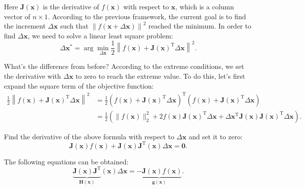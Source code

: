 Here $\bm{J}(\bm{x})$ is the derivative of $f(\bm{x})$ with respect to $\bm{x}$, which is a column vector of $n \times 1$. According to the previous framework, the current goal is to find the increment $\Delta \bm{x}$ such that $\left\| {f\left( \bm{x} + \Delta \bm{x} \right)} \right \|^2$ reached the minimum. In order to find $\Delta \bm{x}$, we need to solve a linear least square problem:
\begin{equation}
    \Delta \bm{x}^* = \arg \mathop {\min }\limits_{\Delta \bm{x}} \frac{1}{2}{\left\| {f\left( \bm{x} \right) + \bm{J} \left( \bm{x} \right)^\mathrm{T} \Delta \bm{x} } \right\|^2}.
\end{equation}
    
What's the difference from before? According to the extreme conditions, we set the derivative with $\Delta \bm{x}$ to zero to reach the extreme value. To do this, let's first expand the square term of the objective function:
\begin{align*}
    \frac{1}{2}{\left\| {f\left( \bm{x} \right) + \bm{J} \left( \bm{x} \right)^\mathrm{T} \Delta \bm{x}} \right\|^2} &= \frac{1}{2}{\left( {f\left( \bm{x} \right) + \bm{J}\left( \bm{x} \right)^\mathrm{T} \Delta \bm{x}} \right)^\mathrm{T}}\left( {f\left( \bm{x} \right) + \bm{J} \left( \bm{x} \right)^\mathrm{T} \Delta \bm{x}} \right)\\
    &= \frac{1}{2}\left( \| f{{\left( \bm{x} \right)}\|^2_2 + 2 f\left( \bm{x} \right) \bm{J} {{\left( \bm{x} \right)}}^\mathrm{T} \Delta \bm{x} + \Delta { \bm{x}^\mathrm{T}}{\bm{J} (\bm{x})} \bm{J}(\bm{x})^\mathrm{T} \Delta \bm{x}} \right).
\end{align*}


Find the derivative of the above formula with respect to $\Delta \bm{x}$ and set it to zero:
\begin{displaymath}
    \bm{J} {\left( \bm{x} \right)}f\left( \bm{x} \right) + \bm{J} {\left( \bm{x} \right)} \bm{J}^\mathrm{T} \left( \bm{x} \right)\Delta \bm{x} = \bm{0}.
\end{displaymath}

The following equations can be obtained:
\begin{equation}
    \underbrace{\bm{J} {\left( \bm{x} \right)} \bm{J}^\mathrm{T}}_{\bm{H}(\bm{x})} \left( \bm{x} \right)\Delta \bm{x} =  \underbrace{- \bm{J} {\left( \bm{x} \right)} f\left( \bm{x} \right)}_{\bm{g}(\bm{x})}.
\end{equation}

